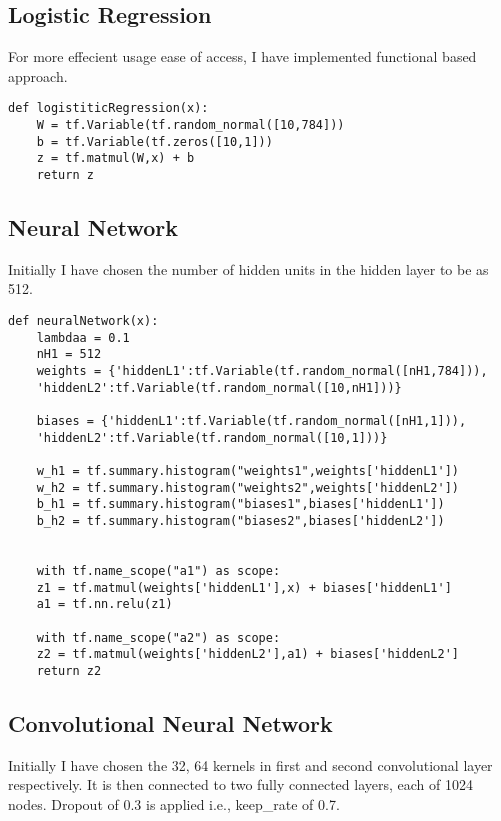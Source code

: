 \documentclass[a4paper,11pt]{article}
\begin{document}
\subsection{Logistic Regression}

For more effecient usage ease of access, I have implemented functional based approach.

\begin{lstlisting}[label={list:second}]
def logistiticRegression(x):
	W = tf.Variable(tf.random_normal([10,784]))
	b = tf.Variable(tf.zeros([10,1]))
	z = tf.matmul(W,x) + b
	return z
\end{lstlisting}

\subsection{Neural Network}
Initially I have chosen the number of hidden units in the hidden layer to be as 512.

\begin{lstlisting}[label={list:second}]
def neuralNetwork(x):
	lambdaa = 0.1
	nH1 = 512
	weights = {'hiddenL1':tf.Variable(tf.random_normal([nH1,784])),
	'hiddenL2':tf.Variable(tf.random_normal([10,nH1]))}
	
	biases = {'hiddenL1':tf.Variable(tf.random_normal([nH1,1])),
	'hiddenL2':tf.Variable(tf.random_normal([10,1]))}
	
	w_h1 = tf.summary.histogram("weights1",weights['hiddenL1'])
	w_h2 = tf.summary.histogram("weights2",weights['hiddenL2'])
	b_h1 = tf.summary.histogram("biases1",biases['hiddenL1'])
	b_h2 = tf.summary.histogram("biases2",biases['hiddenL2'])
	
	
	with tf.name_scope("a1") as scope:
	z1 = tf.matmul(weights['hiddenL1'],x) + biases['hiddenL1']
	a1 = tf.nn.relu(z1)
	
	with tf.name_scope("a2") as scope:
	z2 = tf.matmul(weights['hiddenL2'],a1) + biases['hiddenL2']
	return z2
\end{lstlisting}

\subsection{Convolutional Neural Network}
Initially I have chosen the 32, 64 kernels in first and second convolutional layer respectively. It is then connected to two fully connected layers, each of 1024 nodes. Dropout of 0.3 is applied i.e., keep\_rate of 0.7.
\end{document}
